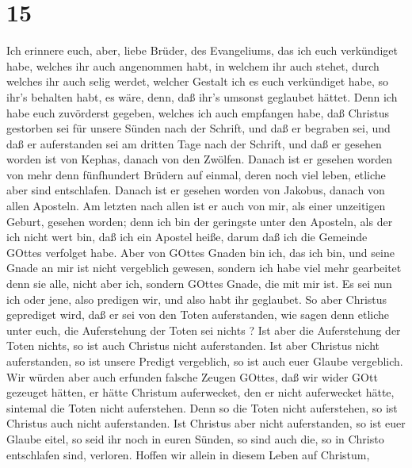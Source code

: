 \hypertarget{section-14}{%
\section{15}\label{section-14}}

 Ich erinnere euch, aber, liebe Brüder, des Evangeliums, das
ich euch verkündiget habe, welches ihr auch angenommen habt, in welchem
ihr auch stehet,  durch welches ihr auch selig werdet,
welcher Gestalt ich es euch verkündiget habe, so ihr's behalten habt, es
wäre, denn, daß ihr's umsonst geglaubet hättet.  Denn ich
habe euch zuvörderst gegeben, welches ich auch empfangen habe, daß
Christus gestorben sei für unsere Sünden nach der Schrift, 
und daß er begraben sei, und daß er auferstanden sei am dritten Tage
nach der Schrift,  und daß er gesehen worden ist von Kephas,
danach von den Zwölfen.  Danach ist er gesehen worden von
mehr denn fünfhundert Brüdern auf einmal, deren noch viel leben, etliche
aber sind entschlafen.  Danach ist er gesehen worden von
Jakobus, danach von allen Aposteln.  Am letzten nach allen
ist er auch von mir, als einer unzeitigen Geburt, gesehen worden;
 denn ich bin der geringste unter den Aposteln, als der ich
nicht wert bin, daß ich ein Apostel heiße, darum daß ich die Gemeinde
GOttes verfolget habe.  Aber von GOttes Gnaden bin ich, das
ich bin, und seine Gnade an mir ist nicht vergeblich gewesen, sondern
ich habe viel mehr gearbeitet denn sie alle, nicht aber ich, sondern
GOttes Gnade, die mit mir ist.  Es sei nun ich oder jene,
also predigen wir, und also habt ihr geglaubet.  So aber
Christus geprediget wird, daß er sei von den Toten auferstanden, wie
sagen denn etliche unter euch, die Auferstehung der Toten sei nichts ?
 Ist aber die Auferstehung der Toten nichts, so ist auch
Christus nicht auferstanden.  Ist aber Christus nicht
auferstanden, so ist unsere Predigt vergeblich, so ist auch euer Glaube
vergeblich.  Wir würden aber auch erfunden falsche Zeugen
GOttes, daß wir wider GOtt gezeuget hätten, er hätte Christum
auferwecket, den er nicht auferwecket hätte, sintemal die Toten nicht
auferstehen.  Denn so die Toten nicht auferstehen, so ist
Christus auch nicht auferstanden.  Ist Christus aber nicht
auferstanden, so ist euer Glaube eitel, so seid ihr noch in euren
Sünden,  so sind auch die, so in Christo entschlafen sind,
verloren.  Hoffen wir allein in diesem Leben auf Christum,
